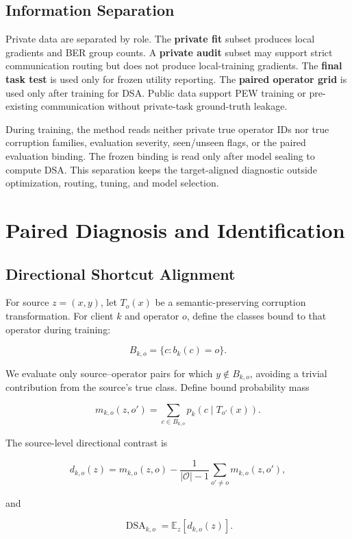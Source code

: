 \subsection{Information Separation}

Private data are separated by role. The \textbf{private fit} subset produces local gradients and BER group counts. A \textbf{private audit} subset may support strict communication routing but does not produce local-training gradients. The \textbf{final task test} is used only for frozen utility reporting. The \textbf{paired operator grid} is used only after training for DSA. Public data support PEW training or pre-existing communication without private-task ground-truth leakage.

During training, the method reads neither private true operator IDs nor true corruption families, evaluation severity, seen/unseen flags, or the paired evaluation binding. The frozen binding is read only after model sealing to compute DSA. This separation keeps the target-aligned diagnostic outside optimization, routing, tuning, and model selection.

\section{Paired Diagnosis and Identification}

\subsection{Directional Shortcut Alignment}

For source \(z=(x,y)\), let \(T_o(x)\) be a semantic-preserving corruption transformation. For client \(k\) and operator \(o\), define the classes bound to that operator during training:

\[
B_{k,o}=\{c:b_k(c)=o\}.
\]

We evaluate only source--operator pairs for which \(y\notin B_{k,o}\), avoiding a trivial contribution from the source's true class. Define bound probability mass

\[
m_{k,o}(z,o')=\sum_{c\in B_{k,o}}p_k(c\mid T_{o'}(x)).
\]

The source-level directional contrast is

\[
d_{k,o}(z)=m_{k,o}(z,o)
-\frac{1}{|\mathcal O|-1}\sum_{o'\neq o}m_{k,o}(z,o'),
\]

and

\[
\operatorname{DSA}_{k,o}=\mathbb E_z[d_{k,o}(z)].
\]

